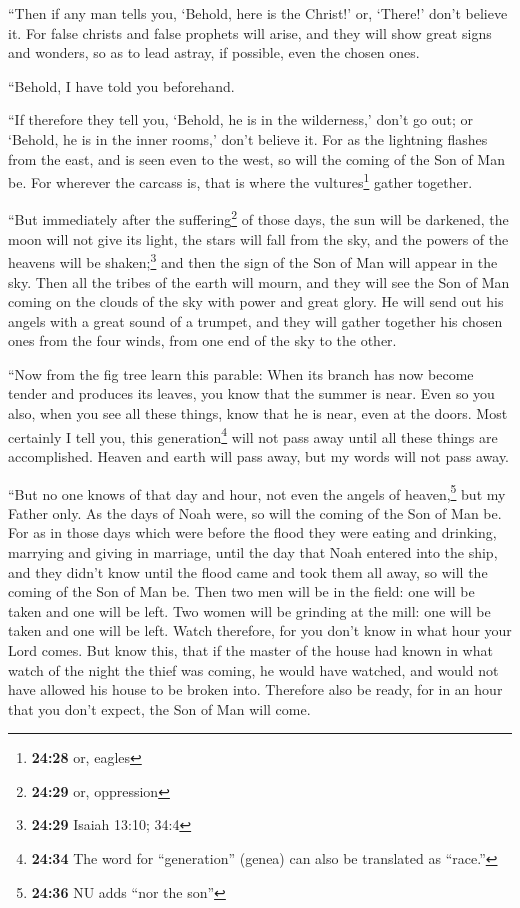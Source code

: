  ``Then if any man tells you, `Behold, here is the
Christ!' or, `There!' don't believe it.  For false
christs and false prophets will arise, and they will show great signs
and wonders, so as to lead astray, if possible, even the chosen ones.

 ``Behold, I have told you beforehand.

 ``If therefore they tell you, `Behold, he is in the
wilderness,' don't go out; or `Behold, he is in the inner rooms,' don't
believe it.  For as the lightning flashes from the east,
and is seen even to the west, so will the coming of the Son of Man be.
 For wherever the carcass is, that is where the
vultures\footnote{\textbf{24:28} or, eagles} gather together.

 ``But immediately after the suffering\footnote{\textbf{24:29}
  or, oppression} of those days, the sun will be darkened, the moon will
not give its light, the stars will fall from the sky, and the powers of
the heavens will be shaken;\footnote{\textbf{24:29} Isaiah 13:10; 34:4}
 and then the sign of the Son of Man will appear in the
sky. Then all the tribes of the earth will mourn, and they will see the
Son of Man coming on the clouds of the sky with power and great glory.
 He will send out his angels with a great sound of a
trumpet, and they will gather together his chosen ones from the four
winds, from one end of the sky to the other.

 ``Now from the fig tree learn this parable: When its
branch has now become tender and produces its leaves, you know that the
summer is near.  Even so you also, when you see all these
things, know that he is near, even at the doors.  Most
certainly I tell you, this generation\footnote{\textbf{24:34} The word
  for ``generation'' (genea) can also be translated as ``race.''} will
not pass away until all these things are accomplished. 
Heaven and earth will pass away, but my words will not pass away.

 ``But no one knows of that day and hour, not even the
angels of heaven,\footnote{\textbf{24:36} NU adds ``nor the son''} but
my Father only.  As the days of Noah were, so will the
coming of the Son of Man be.  For as in those days which
were before the flood they were eating and drinking, marrying and giving
in marriage, until the day that Noah entered into the ship,
 and they didn't know until the flood came and took them
all away, so will the coming of the Son of Man be.  Then
two men will be in the field: one will be taken and one will be left.
 Two women will be grinding at the mill: one will be
taken and one will be left.  Watch therefore, for you
don't know in what hour your Lord comes.  But know this,
that if the master of the house had known in what watch of the night the
thief was coming, he would have watched, and would not have allowed his
house to be broken into.  Therefore also be ready, for in
an hour that you don't expect, the Son of Man will come.

